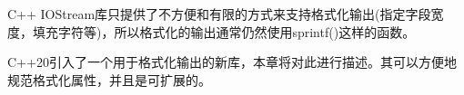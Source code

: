 C++ IOStream库只提供了不方便和有限的方式来支持格式化输出(指定字段宽度，填充字符等)，所以格式化的输出通常仍然使用sprintf()这样的函数。

C++20引入了一个用于格式化输出的新库，本章将对此进行描述。其可以方便地规范格式化属性，并且是可扩展的。